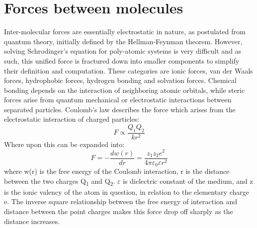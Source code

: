 \section{Forces between molecules}
Inter-molecular forces are essentially electrostatic in nature, as postulated from quantum theory, initially defined by the Hellman-Feynman theorem. %
However, %
solving Schrodinger's equation for poly-atomic systems is very difficult and as such, this unified force is fractured down into smaller %
components to simplify their definition and %
computation. These categories are %
ionic forces, van der Waals forces, hydrophobic forces, hydrogen bonding and solvation forces. 
Chemical bonding depends on the interaction of neighboring atomic orbitals, while steric forces arise from quantum mechanical or electrostatic interactions between separated particles. %
Coulomb's %
law %
describes the force %
which arises from the electrostatic interaction of charged particles:
\begin{equation}
F \propto \frac{Q_1 Q_2}{kr^2}
\end{equation}
Where upon this can be expanded into:
\begin{equation} %
F = -\frac{dw(r)}{dr} =  \frac{z_1z_2e^2}{4\pi\varepsilon_0\varepsilon r^2}
\end{equation}
where w(r) is the free energy of the Coulomb interaction, r is the distance between the two charges Q\textsubscript{1} and Q\textsubscript{2}. $\varepsilon$ is dielectric constant of the medium, and z is the ionic valency of the atom in question, in relation to the elementary charge e. %
The inverse square relationship between the free energy of interaction and distance between the point charges makes this force drop off sharply as the distance increases.
